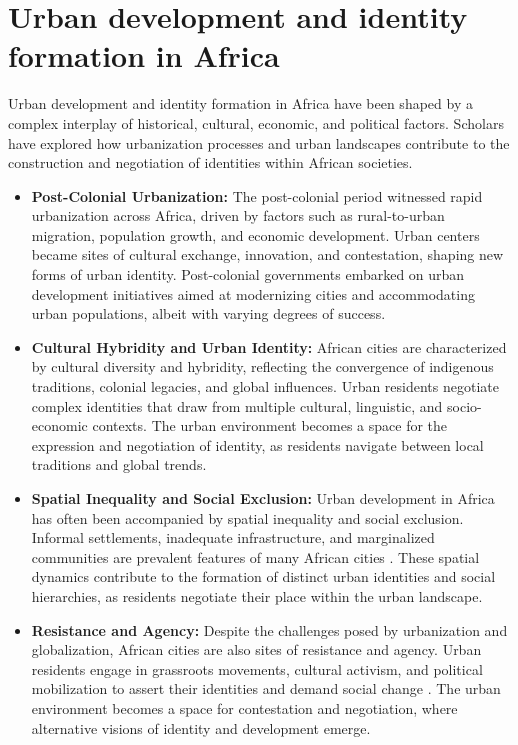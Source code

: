 \section{Urban development and identity formation in Africa}
Urban development and identity formation in Africa have been shaped by a complex interplay of historical, cultural, economic, and political factors. Scholars have explored how urbanization processes and urban landscapes contribute to the construction and negotiation of identities within African societies.
\begin{itemize}
    \item \textbf{Post-Colonial Urbanization:}
    The post-colonial period witnessed rapid urbanization across Africa, driven by factors such as rural-to-urban migration, population growth, and economic development. Urban centers became sites of cultural exchange, innovation, and contestation, shaping new forms of urban identity\cite{Onilude}. Post-colonial governments embarked on urban development initiatives aimed at modernizing cities and accommodating urban populations, albeit with varying degrees of success.
    \item \textbf{Cultural Hybridity and Urban Identity:}
    African cities are characterized by cultural diversity and hybridity, reflecting the convergence of indigenous traditions, colonial legacies, and global influences. Urban residents negotiate complex identities that draw from multiple cultural, linguistic, and socio-economic contexts\cite{Onilude}. The urban environment becomes a space for the expression and negotiation of identity, as residents navigate between local traditions and global trends.
    \item \textbf{Spatial Inequality and Social Exclusion:}
    Urban development in Africa has often been accompanied by spatial inequality and social exclusion. Informal settlements, inadequate infrastructure, and marginalized communities are prevalent features of many African cities \cite{falola2008history}. These spatial dynamics contribute to the formation of distinct urban identities and social hierarchies, as residents negotiate their place within the urban landscape.
    \item \textbf{Resistance and Agency:}
    Despite the challenges posed by urbanization and globalization, African cities are also sites of resistance and agency. Urban residents engage in grassroots movements, cultural activism, and political mobilization to assert their identities and demand social change \cite{Onilude}. The urban environment becomes a space for contestation and negotiation, where alternative visions of identity and development emerge.
\end{itemize}
